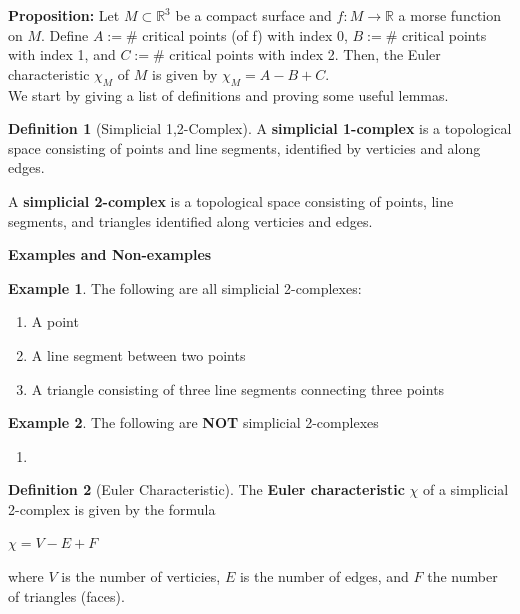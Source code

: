 \documentclass[12pt]{article}
\newcommand{\bR}{{\mathbb R}}
\theoremstyle{definition}
\newtheorem{definition}{Definition}
\newtheorem{eg}{Example}
\begin{document}
\graphicspath{ {images/} }
\pagestyle{empty}

\noindent
\textbf{Proposition:} Let $M\subset \bR^3$ be a compact surface and  $f:M\rightarrow \bR$ a morse function on $M$. Define $A := \#$ critical points (of f) with index 0, $B:= \#$ critical points with index 1, and $C:=\#$ critical points with index 2. Then, the Euler characteristic $\chi_M$ of $M$ is given by $\chi_M = A-B+C$. \\

We start by giving a list of definitions and proving some useful lemmas. 

\begin{definition}[Simplicial 1,2-Complex]
      A \textbf{simplicial 1-complex} is a topological space consisting of points and line segments, identified by verticies and along edges. 

      A \textbf{simplicial 2-complex} is a topological space consisting of points, line segments, and triangles identified along verticies and edges. 
\end{definition}

\textbf{Examples and Non-examples}
\begin{eg}
      The following are all simplicial 2-complexes:
      \begin{enumerate}
            \item A point
            \item A line segment between two points
            \item A triangle consisting of three line segments connecting three points
      \end{enumerate}
\end{eg}

\begin{eg}
      The following are \textbf{NOT} simplicial 2-complexes
      \begin{enumerate}
            \item 
      \end{enumerate}
\end{eg}


\begin{definition}[Euler Characteristic]
      The \textbf{Euler characteristic} $\chi$ of a simplicial 2-complex is given by the formula 
      \begin{center}
            $\chi = V-E + F$
      \end{center}
      where $V$ is the number of verticies, $E$ is the number of edges, and $F$ the number of triangles (faces). 
      
\end{definition}
\end{document}
